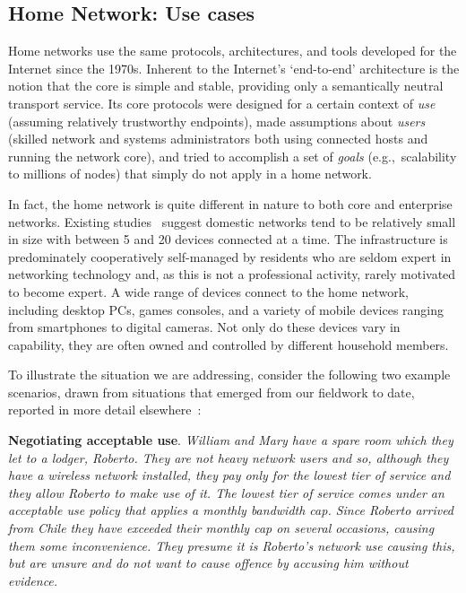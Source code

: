 \subsection{Home Network: Use cases}

Home networks use the same protocols, architectures, and tools developed for the
Internet since the 1970s.  Inherent to the Internet's `end-to-end' architecture
is the notion that the core is simple and stable, providing only a semantically
neutral transport service.  Its core protocols were designed for a certain
context of \emph{use} (assuming relatively trustworthy endpoints), made
assumptions about \emph{users} (skilled network and systems administrators both
using connected hosts and running the network core), and tried to accomplish a
set of \emph{goals} (e.g.,~scalability to millions of nodes) that simply do not
apply in a home network. 

In fact, the home network is quite different in nature to both core and
enterprise networks.  Existing
studies~\cite{tolmie07:_makin,shehan07:_home_networ_hci,shehanpoole08:_desig_inter_home_networ_maint_tools}
suggest domestic networks tend to be relatively small in size with between 5 and
20 devices connected at a time.  The infrastructure is predominately
cooperatively self-managed by residents who are seldom expert in networking
technology and, as this is not a professional activity, rarely motivated to
become expert.  A wide range of devices connect to the home network, including
desktop PCs, games consoles, and a variety of mobile devices ranging from
smartphones to digital cameras.  Not only do these devices vary in capability,
they are often owned and controlled by different household members.  

To illustrate the situation we are addressing, consider the following two
example scenarios, drawn from  situations that emerged from our fieldwork to
date, reported in more detail elsewhere~\cite{wmust2011}: 
 
\textbf{Negotiating acceptable use}.  {\it William and Mary have a spare room
  which they let to a lodger, Roberto.  They are not heavy network users and so,
  although they have a wireless network installed, they pay only for the lowest
  tier of service and they allow Roberto to make use of it.  The lowest tier of
  service comes under an acceptable use policy that applies a monthly bandwidth
  cap.  Since Roberto arrived from Chile they have exceeded their monthly cap on
  several occasions, causing them some inconvenience.  They presume it is
  Roberto's network use causing this, but are unsure and do not want to cause
  offence by accusing him without evidence.}

